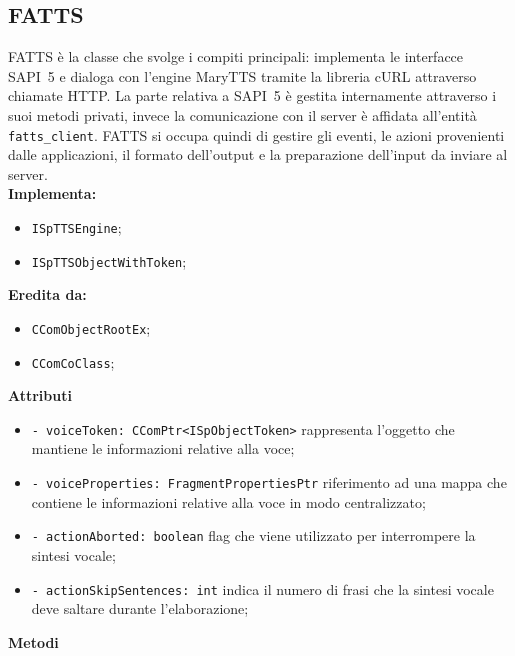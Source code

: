 \subsection{FATTS}
FATTS è la classe che svolge i compiti principali: implementa le interfacce SAPI~5 e dialoga con l'engine MaryTTS tramite la libreria cURL attraverso chiamate HTTP. La parte relativa a SAPI~5 è gestita internamente attraverso i suoi metodi privati, invece la comunicazione con il server è affidata all'entità \texttt{fatts\_client}. FATTS si occupa quindi di gestire gli eventi, le azioni provenienti dalle applicazioni, il formato dell'output e la preparazione dell'input da inviare al server.\\    
\textbf{Implementa:}
\begin{itemize}
	\item \texttt{ISpTTSEngine};
	\item \texttt{ISpTTSObjectWithToken};
\end{itemize}
\textbf{Eredita da:}
\begin{itemize}
	\item \texttt{CComObjectRootEx};
	\item \texttt{CComCoClass};
\end{itemize}
\textbf{Attributi}
\begin{itemize}
	\item \texttt{- voiceToken: CComPtr<ISpObjectToken>} rappresenta l'oggetto che mantiene le informazioni relative alla voce;
	\item \texttt{- voiceProperties: FragmentPropertiesPtr} riferimento ad una mappa che contiene le informazioni relative alla voce in modo centralizzato;
	\item \texttt{- actionAborted: boolean} flag che viene utilizzato per interrompere la sintesi vocale;
	\item \texttt{- actionSkipSentences: int} indica il numero di frasi che la sintesi vocale deve saltare durante l'elaborazione;   
\end{itemize}
\textbf{Metodi}
